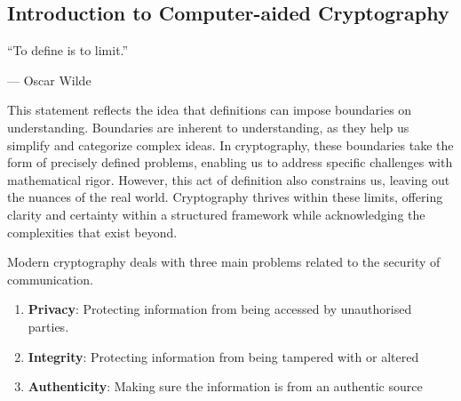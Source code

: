 \subsection{Introduction to Computer-aided Cryptography}
\begin{center}
	\enquote{To define is to limit.}
\end{center}
\begin{flushright}
	--- Oscar Wilde
\end{flushright}
This statement reflects the idea that definitions can impose boundaries on understanding. Boundaries are inherent to understanding, as they help us simplify and categorize complex ideas. In cryptography, these boundaries take the form of precisely defined problems, enabling us to address specific challenges with mathematical rigor. However, this act of definition also constrains us, leaving out the nuances of the real world. Cryptography thrives within these limits, offering clarity and certainty within a structured framework while acknowledging the complexities that exist beyond.\par
Modern cryptography deals with three main problems related to the security of communication.
\begin{enumerate}
	\item \textbf{Privacy}:  Protecting information from being accessed by unauthorised parties.
	\item \textbf{Integrity}: Protecting information from being tampered with or altered
	\item \textbf{Authenticity}: Making sure the information is from an authentic source
\end{enumerate}
